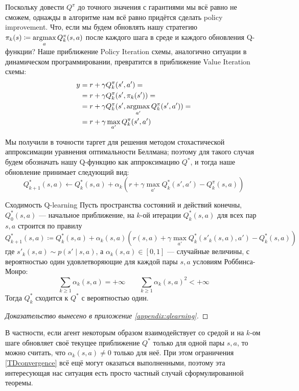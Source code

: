 Поскольку довести $Q^{\pi}$ до точного значения с гарантиями мы всё равно не сможем, однажды в алгоритме нам всё равно придётся сделать policy improvement. Что, если мы будем обновлять нашу стратегию $\pi_k(s) \coloneqq \mathop{\mathrm{argmax}}\limits_a Q^{\pi}_k(s, a)$ после каждого шага в среде и каждого обновления Q-функции? Наше приближение Policy Iteration схемы, аналогично ситуации в динамическом программировании, превратится в приближение Value Iteration схемы:
\begin{align*}
y &= r + \gamma Q^{\pi}_k(s', a') = \\
&= r + \gamma Q^{\pi}_k(s', \pi_k(s')) = \\
&= r + \gamma Q^{\pi}_k(s', \mathop{\mathrm{argmax}}_{a'} Q^{\pi}_k(s', a')) = \\
&= r + \gamma \max_{a'} Q^{\pi}_k(s', a')
\end{align*}

Мы получили в точности таргет для решения методом стохастической аппроксимации уравнения оптимальности Беллмана; поэтому для такого случая будем обозначать нашу Q-функцию как аппроксимацию $Q^*$, и тогда наше обновление принимает следующий вид:
\begin{equation}\label{Qlearningupdate}
Q^*_{k+1}(s, a) \leftarrow Q^{*}_k(s, a) + \alpha_k \left( r + \gamma \max_{a'} Q^{*}_k(s', a') - 
Q^{\pi}_k(s, a) \right) 
\end{equation}

\begin{theoremBox}[label=th:TDconvergencetheorem]{Сходимость Q-learning}
Пусть пространства состояний и действий конечны, $Q^*_0(s, a)$ --- начальное приближение, на $k$-ой итерации $Q^*_k(s, a)$ для всех пар $s, a$ строится по правилу
$$Q^*_{k+1}(s, a) \coloneqq Q^*_k(s, a) + \alpha_k(s, a) \left( r(s, a) + \gamma \max_{a'} Q^*_k(s'_k(s, a), a') - Q^*_k(s, a)\right)$$
где $s'_k(s, a) \sim p(s' \mid s, a)$, а $\alpha_k(s, a) \in [0, 1]$ --- случайные величины, с вероятностью один удовлетворяющие для каждой пары $s, a$ условиям Роббинса-Монро:
\begin{equation}\label{TDconvergence}
\sum_{k \ge 1} \alpha_k(s, a) = +\infty \qquad \sum_{k \ge 1} \alpha_k(s, a)^2 < +\infty
\end{equation}
Тогда $Q^*_k$ сходится к $Q^*$ с вероятностью один.
\begin{proof}[Доказательство вынесено в приложение \ref{appendix:qlearning}]
\end{proof}
\end{theoremBox}

В частности, если агент некоторым образом взаимодействует со средой и на $k$-ом шаге обновляет своё текущее приближение $Q^*$ только для одной пары $s, a$, то можно считать, что $\alpha_k(s, a) \ne 0$ только для неё. При этом ограничения \eqref{TDconvergence} всё ещё могут оказаться выполненными, поэтому эта интересующая нас ситуация есть просто частный случай сформулированной теоремы.


